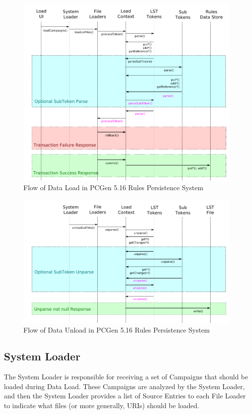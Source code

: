 \documentclass[12pt,letterpaper]{article}
\newcommand{\pcgenversEOS}{5.16}
\newcommand{\systemEOS}{Rules Persistence System}
\newcommand{\system}{\systemEOS{} }
\newcommand{\pcgenvers}{\pcgenversEOS{} }
\newcommand{\lsubsection}[1]{\label{#1}\subsection{#1}}
\newcommand{\openfig}{\begin{figure}[hbt]}
\newcommand{\closefig}[1]{\vspace*{-0.15in}\caption{#1}\end{figure}}
\begin{document}
\openfig\centerline{\includegraphics[width=6.5in]{rslf.pdf}}\closefig{\label{Fig: Flow of Data Load}Flow of Data Load in PCGen \pcgenvers \system }

\openfig\centerline{\includegraphics[width=6.5in]{rsuf.pdf}}\closefig{\label{Fig: Flow of Data Unload}Flow of Data Unload in PCGen \pcgenvers \system }

\lsubsection{System Loader}

The System Loader is responsible for receiving a set of Campaigns that should be 
loaded during Data Load.  These Campaigns are analyzed by the System Loader, and 
then the System Loader provides a list of Source Entries to each File Loader to
indicate what files (or more generally, URIs) should be loaded.
\end{document}
